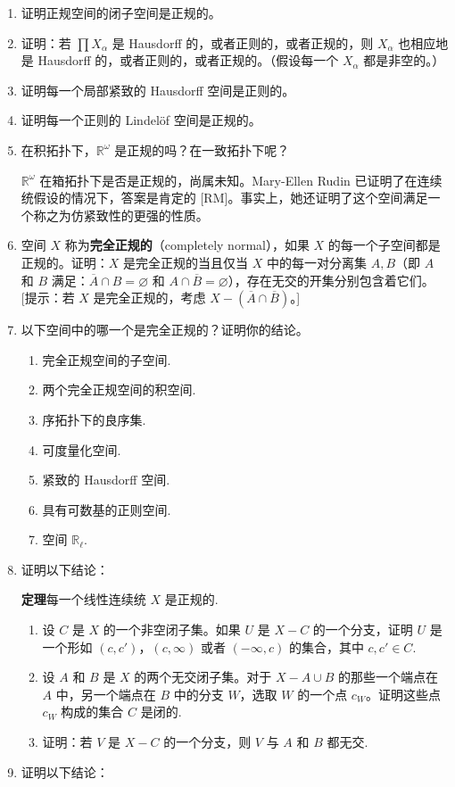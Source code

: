 \begin{enumerate}
\item 证明正规空间的闭子空间是正规的。
\item 证明：若 $\prod X_{\alpha}$ 是 Hausdorff 的，或者正则的，或者正规的，则 $X_{\alpha}$ 也相应地是 Hausdorff 的，或者正则的，或者正规的。（假设每一个 $X_{\alpha}$ 都是非空的。）
\item 证明每一个局部紧致的 Hausdorff 空间是正则的。
\item 证明每一个正则的 Lindelöf 空间是正规的。
\item 在积拓扑下，$\mathbb{R}^{\omega}$ 是正规的吗？在一致拓扑下呢？

$\mathbb{R}^{\omega}$ 在箱拓扑下是否是正规的，尚属未知。Mary-Ellen Rudin 已证明了在连续统假设的情况下，答案是肯定的 [RM]。事实上，她还证明了这个空间满足一个称之为仿紧致性的更强的性质。
\item 空间 $X$ 称为\textbf{完全正规的}（completely normal），如果 $X$ 的每一个子空间都是正规的。证明：$X$ 是完全正规的当且仅当 $X$ 中的每一对分离集 $A,B$（即 $A$ 和 $B$ 满足：$\overline{A}\cap B=\varnothing$ 和 $A\cap\overline{B}=\varnothing$），存在无交的开集分别包含着它们。[提示：若 $X$ 是完全正规的，考虑 $X-(\overline{A}\cap\overline{B})$。]
\item 以下空间中的哪一个是完全正规的？证明你的结论。
\begin{enumerate}
\item 完全正规空间的子空间.
\item 两个完全正规空间的积空间.
\item 序拓扑下的良序集.
\item 可度量化空间.
\item 紧致的 Hausdorff 空间.
\item 具有可数基的正则空间.
\item 空间 $\mathbb{R}_{\ell}$.
\end{enumerate}
\item 证明以下结论：

\textbf{定理}\quad 每一个线性连续统 $X$ 是正规的.
\begin{enumerate}
\item 设 $C$ 是 $X$ 的一个非空闭子集。如果 $U$ 是 $X-C$ 的一个分支，证明 $U$ 是一个形如 $(c,c')$，$(c,\infty)$ 或者 $(-\infty,c)$ 的集合，其中 $c,c'\in C$.
\item 设 $A$ 和 $B$ 是 $X$ 的两个无交闭子集。对于 $X-A\cup B$ 的那些一个端点在 $A$ 中，另一个端点在 $B$ 中的分支 $W$，选取 $W$ 的一个点 $c_{W}$。证明这些点 $c_{W}$ 构成的集合 $C$ 是闭的.
\item 证明：若 $V$ 是 $X-C$ 的一个分支，则 $V$ 与 $A$ 和 $B$ 都无交.
\end{enumerate}
\item 证明以下结论：


\end{enumerate}
